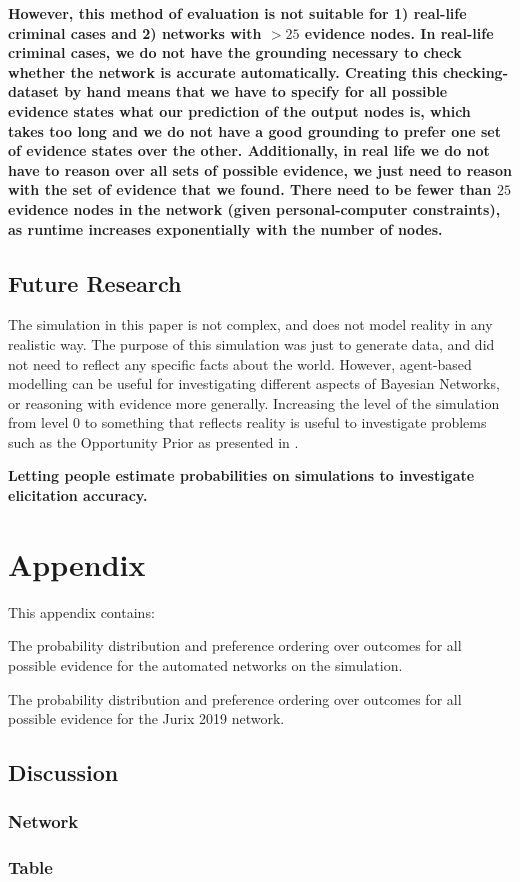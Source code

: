 \documentclass[12pt]{article}
\begin{document}
 \textbf{However, this method of evaluation is not suitable for 1) real-life criminal cases and 2) networks with $> 25$ evidence nodes. In real-life criminal cases, we do not have the grounding necessary to check whether the network is accurate automatically. Creating this checking-dataset by hand means that we have to specify for all possible evidence states what our prediction of the output nodes is, which takes too long and we do not have a good grounding to prefer one set of evidence states over the other. Additionally, in real life we do not have to reason over all sets of possible evidence, we just need to reason with the set of evidence that we found. There need to be fewer than $25$ evidence nodes in the network (given personal-computer constraints), as runtime increases exponentially with the number of nodes.}

 
\subsection{Future Research}

The simulation in this paper is not complex, and does not model reality in any realistic way. The purpose of this simulation was just to generate data, and did not need to reflect any specific facts about the world. However, agent-based modelling can be useful for investigating different aspects of Bayesian Networks, or reasoning with evidence more generally. Increasing the level of the simulation from level 0 to something that reflects reality is useful to investigate problems such as the Opportunity Prior as presented in \citet{Fenton2017}. 


\textbf{Letting people estimate probabilities on simulations to investigate elicitation accuracy.}






\section{Appendix}

This appendix contains:

The probability distribution and preference ordering over outcomes for all possible evidence for the automated networks on the simulation.

The probability distribution and preference ordering over outcomes for all possible evidence for the Jurix 2019 network.

\newpage

\subsection{Discussion}
\subsubsection{Network}

\subsubsection{Table}

\end{document}
